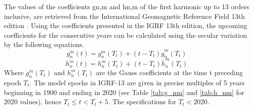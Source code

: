 The values of the coefficients gn,m and hn,m of the first harmonic up to 13 orders inclusive, are retrieved from the International Geomagnetic Reference Field 13th edition \cite{alken2021international}. Using the coefficients presented in the IGRF 13th edition, the upcoming coefficients for the consecutive years can be calculated using the secular variation by the following equations.
\begin{equation}
    g_n^m(t) = g_n^m(T_t) + (t-T_t)\dot{g}_n^m(T_t)
\end{equation}
\begin{equation}
        h_n^m(t) = h_n^m(T_t) + (t-T_t)\dot{h}_n^m(T_t)
\end{equation}
Where $g_n^m(T_t)$ and $h_n^m (T_t)$ are the Gauss coefficients at the time t preceding epoch $T_t$. The model epochs in IGRF-13 are given in precise multiples of 5 years beginning in 1900 and ending in 2020 (see Table \ref{tab:g_nm} and \ref{tab:h_nm} for 2020 values), hence $T_t \leqslant t < T_t + 5$. The specifications for $T_t < 2020$.


